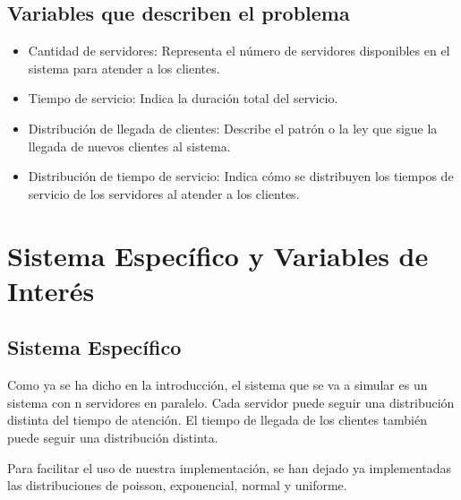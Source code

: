 \documentclass[11pt]{article}
\begin{document}
    \subsection{Variables que describen el problema}

    \begin{itemize}
        \item Cantidad de servidores: Representa el número de servidores disponibles en el sistema para atender a los clientes.

        \item Tiempo de servicio: Indica la duración total del servicio.

        \item Distribución de llegada de clientes: Describe el patrón o la ley que sigue la llegada de nuevos clientes al sistema.

        \item Distribución de tiempo de servicio: Indica cómo se distribuyen los tiempos de servicio de los servidores al atender a los clientes.

        \end{itemize}



    \section{Sistema Específico y Variables de Interés}
    \subsection{Sistema Específico}
    Como ya se ha dicho en la introducción, el sistema que se va a simular
es un sistema con n servidores en paralelo. Cada servidor puede seguir una distribución distinta del tiempo de atención.
El tiempo de llegada de los clientes también puede seguir una distribución distinta.

Para facilitar el uso de nuestra implementación, se han dejado ya implementadas las distribuciones de poisson, exponencial, normal y uniforme.
\end{document}
